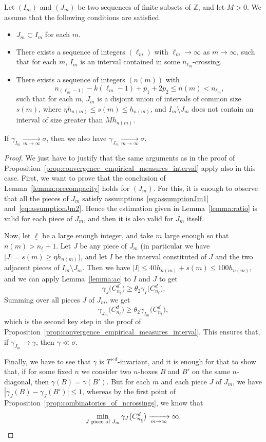 \documentclass[10pt]{amsart}
\theoremstyle{definition}\newtheorem{defi}[theo]{Definition}\newtheorem{rema}[theo]{Remark}\newtheorem{exam}[theo]{Example}\newtheorem{exem}[theo]{Example}\newtheorem{nota}[theo]{Notation}
\newcommand{\tend}[3][]{\xrightarrow[#2\to#3]{#1}}
\newcommand{\ZZ}{\mathbb{Z}}
\newcommand{\cd}{C^{d}}
\newcommand{\td}{T^{\times d}}
\newcommand{\lb}{\underline{\ell}}
\newcommand{\Gam}[1]{\gamma_{#1}\bigl(\cd_{n_{\lb}}\bigr)}
\begin{document}
\begin{prop}\label{prop:convergence_empirical_measures_pieces}
Let $(I_m)$ and $(J_m)$ be two sequences of finite subsets of $\ZZ$, and let $M>0$. We assume that the following conditions are satisfied.
\begin{itemize}
\item $J_m\subset I_m$ for each $m$.
\item There exists a sequence of integers $(\ell_m)$ with $\ell_m\to\infty$ as $m\to\infty$, such that for each $m$, $I_m$ is an interval contained in some $n_{\ell_m}$-crossing.
\item There exists a sequence of integers $(n(m))$ with
\[
n_{(\ell_m-1)} - k(\ell_m-1)+p_1+2p_2 \le n(m) < n_{\ell_m},
\]
such that for each $m$, $J_m$ is a disjoint union of intervals of common size $s(m)$, where $\eta h_{n(m)}\le s(m) \le h_{n(m)}$, and $I_m\setminus J_m$ does not contain an interval of size greater than $Mh_{n(m)}$.
\end{itemize}

If $\gamma_{I_m}\tend{m}{\infty}\sigma$, then we also have $\gamma_{J_m}\tend{m}{\infty}\sigma$.
\end{prop}

\begin{proof}
We just have to justify that the same arguments as in the proof of Proposition~\ref{prop:convergence_empirical_measures_interval} apply also in this case. First, we want to prove that the conclusion of Lemma~\ref{lemma:precompacity} holds for $(J_m)$. For this, it is enough to observe that all the pieces of $J_m$ satisfy assumptions~\eqref{eq:assumptionJm1} and~\eqref{eq:assumptionJm2}. Hence the estimation given in Lemma~\ref{lemma:ratio} is valid for each piece of $J_m$, and then it is also valid for $J_m$ itself.

Now, let $\lb$ be a large enough integer, and take $m$ large enough so that $n(m)>n_{\lb}+1$. Let $J$ be any piece of $J_m$ (in particular we have $|J|=s(m)\ge \eta h_{n(m)}$), and let $I$ be the interval constituted of $J$ and the two adjacent pieces of $I_m\setminus J_m$. Then we have $|I|\le 40 h_{n(m)}+s(m) \le 100 h_{n(m)}$, and we can apply Lemma~\ref{lemma:ac} to $I$ and $J$ to get
\[
\Gam{J} \ge \theta_2 \Gam{I}.
\]
Summing over all pieces $J$ of $J_m$, we get
\[
\Gam{J_m} \ge \theta_2 \Gam{I_m},
\]
which is the second key step in the proof of Proposition~\ref{prop:convergence_empirical_measures_interval}. This ensures that, if $\gamma_{J_m}\to\gamma$, then $\gamma\ll\sigma$.

Finally, we have to see that $\gamma$ is $\td$-invariant, and it is enough for that to show that, if for some fixed $n$ we consider two $n$-boxes $B$ and $B'$ on the same $n$-diagonal, then $\gamma(B)=\gamma(B')$. But for each $m$ and each piece $J$ of $J_m$, we have $\left| \gamma_J(B) - \gamma_J(B') \right| \le 1$, whereas by the first point of Proposition~\ref{prop:combinatorics_of_ncrossings}, we know that
\[
\min_{J\text{ piece of }J_m} \Gam{J} \tend{m}{\infty} \infty.\qedhere
\]
\end{proof}
\end{document}
